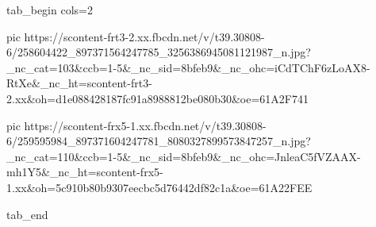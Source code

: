  
 
 
 
 

\ifcmt
  tab_begin cols=2

     pic https://scontent-frt3-2.xx.fbcdn.net/v/t39.30808-6/258604422_897371564247785_3256386945081121987_n.jpg?_nc_cat=103&ccb=1-5&_nc_sid=8bfeb9&_nc_ohc=iCdTChF6zLoAX8-RtXe&_nc_ht=scontent-frt3-2.xx&oh=d1e088428187fc91a8988812be080b30&oe=61A2F741

     pic https://scontent-frx5-1.xx.fbcdn.net/v/t39.30808-6/259595984_897371604247781_8080327899573847257_n.jpg?_nc_cat=110&ccb=1-5&_nc_sid=8bfeb9&_nc_ohc=JnleaC5fVZAAX-mh1Y5&_nc_ht=scontent-frx5-1.xx&oh=5c910b80b9307eecbc5d76442df82c1a&oe=61A22FEE

  tab_end
\fi

